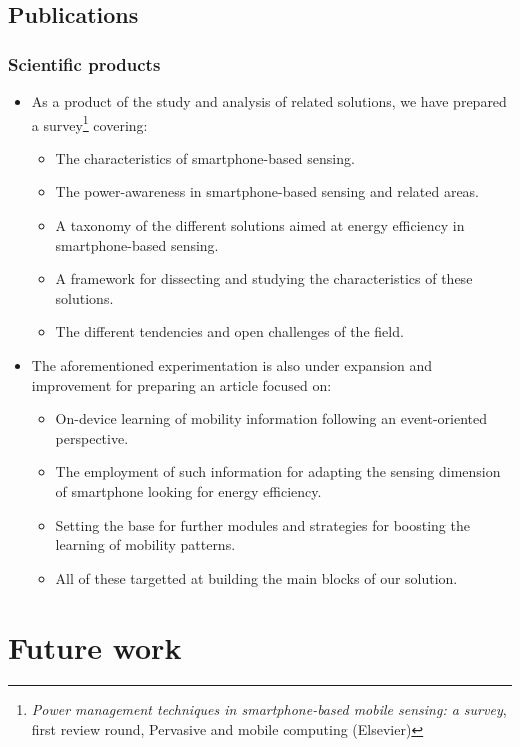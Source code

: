 \documentclass[compress,9pt,xcolor={dvipsnames,table}]{beamer}
\begin{document}
\subsection{Publications}
\begin{frame}[t]\frametitle{Scientific products}
\begin{itemize}
  \item As a product of the study and analysis of related solutions, we have prepared a survey\footnote{\tiny \emph{Power management techniques in smartphone-based mobile sensing: a survey}, first review round, Pervasive and mobile computing (Elsevier)} covering:
  \begin{itemize}
    \item The characteristics of smartphone-based sensing.
    \item The power-awareness in smartphone-based sensing and related areas.
    \item A taxonomy of the different solutions aimed at energy efficiency in smartphone-based sensing.
    \item A framework for dissecting and studying the characteristics of these solutions.
    \item The different tendencies and open challenges of the field.
  \end{itemize}
  \item The aforementioned experimentation is also under expansion and improvement for preparing an article focused on:
  \begin{itemize}
    \item On-device learning of mobility information following an event-oriented perspective.
    \item The employment of such information for adapting the sensing dimension of smartphone looking for energy efficiency.
    \item Setting the base for further modules and strategies for boosting the learning of mobility patterns.
    \item All of these targetted at building the main blocks of our solution.
  \end{itemize}
\end{itemize}
\end{frame}


\section{Future work}
\end{document}

